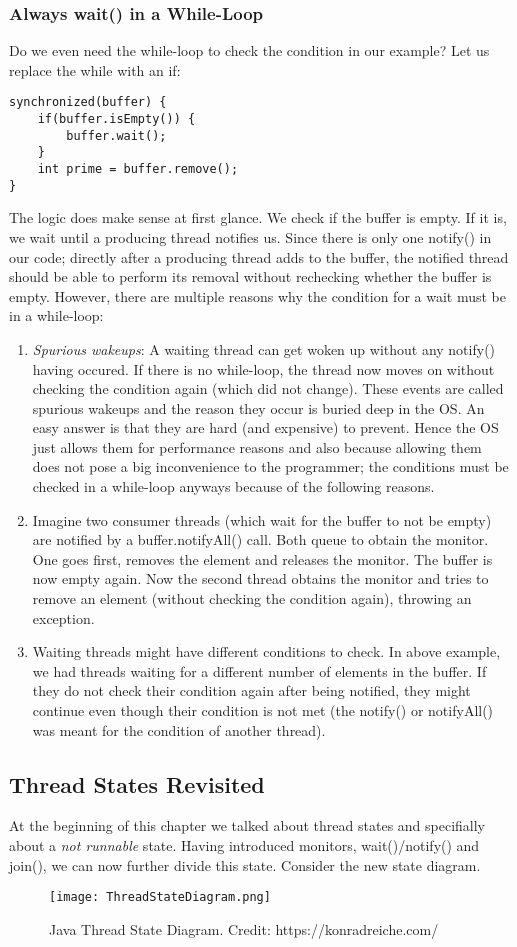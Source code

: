 \documentclass[main.tex]{subfiles}
\begin{document}
\subsubsection{Always wait() in a While-Loop}
Do we even need the while-loop to check the condition in our example? Let us replace the while with an if:
\begin{verbatim}
synchronized(buffer) {
    if(buffer.isEmpty()) {
        buffer.wait();
    }
    int prime = buffer.remove();
}
\end{verbatim}
The logic does make sense at first glance. We check if the buffer is empty. If it is, we wait until a producing thread notifies us. Since there is only one notify() in our code; directly after a producing thread adds to the buffer, the notified thread should be able to perform its removal without rechecking whether the buffer is empty. However, there are multiple reasons why the condition for a wait must be in a while-loop:
\begin{enumerate}
  \item \textit{Spurious wakeups}: A waiting thread can get woken up without any notify() having occured. If there is no while-loop, the thread now moves on without checking the condition again (which did not change). These events are called spurious wakeups and the reason they occur is buried deep in the OS. An easy answer is that they are hard (and expensive) to prevent. Hence the OS just allows them for performance reasons and also because allowing them does not pose a big inconvenience to the programmer; the conditions must be checked in a while-loop anyways because of the following reasons.
  \item Imagine two consumer threads (which wait for the buffer to not be empty) are notified by a buffer.notifyAll() call. Both queue to obtain the monitor. One goes first, removes the element and releases the monitor. The buffer is now empty again. Now the second thread obtains the monitor and tries to remove an element (without checking the condition again), throwing an exception.
  \item Waiting threads might have different conditions to check. In above example, we had threads waiting for a different number of elements in the buffer. If they do not check their condition again after being notified, they might continue even though their condition is not met (the notify() or notifyAll() was meant for the condition of another thread).
\end{enumerate}

\subsection{Thread States Revisited}
At the beginning of this chapter we talked about thread states and specifially about a \textit{not runnable} state. Having introduced monitors, wait()/notify() and join(), we can now further divide this state. Consider the new state diagram.
\begin{figure}[H]
    \centering
    \texttt{[image: ThreadStateDiagram.png]}
    \caption{Java Thread State Diagram. Credit: https://konradreiche.com/}
\end{figure}
\end{document}
